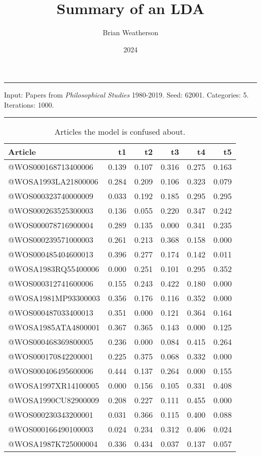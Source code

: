 \documentclass[
  10pt,
  letterpaper,
  DIV=11,
  numbers=noendperiod,
  twoside]{scrartcl}
\title{Summary of an LDA}
\author{Brian Weatherson}
\date{2024}
\renewenvironment{abstract}
 {\vspace{-1.25cm}
 \quotation\small\noindent\rule{\linewidth}{.5pt}\par\smallskip
 \noindent }
 {\par\noindent\rule{\linewidth}{.5pt}\endquotation}
\begin{document}
\maketitle
\begin{abstract}
Input: Papers from \emph{Philosophical Studies} 1980-2019. Seed: 62001.
Categories: 5. Iterations: 1000.
\end{abstract}

\begin{longtable}[]{@{}lrrrrr@{}}

\caption{\label{tbl-confusing}Articles the model is confused about.}

\tabularnewline

\toprule\noalign{}
Article & t1 & t2 & t3 & t4 & t5 \\
\midrule\noalign{}
\endhead
\bottomrule\noalign{}
\endlastfoot
@WOS000168713400006 & 0.139 & 0.107 & 0.316 & 0.275 & 0.163 \\
@WOSA1993LA21800006 & 0.284 & 0.209 & 0.106 & 0.323 & 0.079 \\
@WOS000323740000009 & 0.033 & 0.192 & 0.185 & 0.295 & 0.295 \\
@WOS000263525300003 & 0.136 & 0.055 & 0.220 & 0.347 & 0.242 \\
@WOS000078716900004 & 0.289 & 0.135 & 0.000 & 0.341 & 0.235 \\
@WOS000239571000003 & 0.261 & 0.213 & 0.368 & 0.158 & 0.000 \\
@WOS000485404600013 & 0.396 & 0.277 & 0.174 & 0.142 & 0.011 \\
@WOSA1983RQ55400006 & 0.000 & 0.251 & 0.101 & 0.295 & 0.352 \\
@WOS000312741600006 & 0.155 & 0.243 & 0.422 & 0.180 & 0.000 \\
@WOSA1981MP93300003 & 0.356 & 0.176 & 0.116 & 0.352 & 0.000 \\
@WOS000487033400013 & 0.351 & 0.000 & 0.121 & 0.364 & 0.164 \\
@WOSA1985ATA4800001 & 0.367 & 0.365 & 0.143 & 0.000 & 0.125 \\
@WOS000468369800005 & 0.236 & 0.000 & 0.084 & 0.415 & 0.264 \\
@WOS000170842200001 & 0.225 & 0.375 & 0.068 & 0.332 & 0.000 \\
@WOS000406495600006 & 0.444 & 0.137 & 0.264 & 0.000 & 0.155 \\
@WOSA1997XR14100005 & 0.000 & 0.156 & 0.105 & 0.331 & 0.408 \\
@WOSA1990CU82900009 & 0.208 & 0.227 & 0.111 & 0.455 & 0.000 \\
@WOS000230343200001 & 0.031 & 0.366 & 0.115 & 0.400 & 0.088 \\
@WOS000166490100003 & 0.024 & 0.234 & 0.312 & 0.406 & 0.024 \\
@WOSA1987K725000004 & 0.336 & 0.434 & 0.037 & 0.137 & 0.057 \\

\end{longtable}
\end{document}
